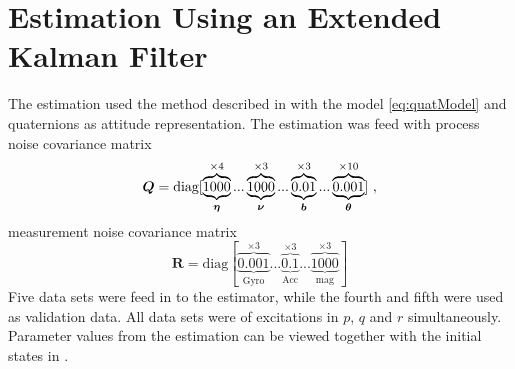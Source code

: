 \section{Estimation Using an Extended Kalman Filter}
The \abbrEKF estimation used the method described in  with the model \eqref{eq:quatModel} and quaternions as attitude representation. The estimation was feed with process noise covariance matrix
\begin{equation*}
\boldsymbol{Q}=\text{diag}[\underbrace{\overbrace{1000}^{\times4}}_{\boldsymbol{\eta}}... \underbrace{\overbrace{1000}^{\times3}}_{\boldsymbol{\nu}}...\underbrace{\overbrace{0.01}^{\times3}}_{\boldsymbol{b}}... \underbrace{\overbrace{0.001}^{\times10}}_{\boldsymbol{\theta}}]\text{ ,}
\end{equation*}
measurement noise covariance matrix
\begin{equation*}
\boldsymbol{R} = \text{diag}[\underbrace{\overbrace{0.001}^{\times3}}_{\text{Gyro}}... \underbrace{\overbrace{0.1}^{\times3}}_{\text{Acc}}... \underbrace{\overbrace{1000}^{\times3}}_{\text{mag}}]
\end{equation*}
Five data sets were feed in to the estimator, while the fourth and fifth were used as validation data. All data sets were of excitations in $p$, $q$ and $r$ simultaneously. Parameter values from the estimation can be viewed together with the initial states in . 

